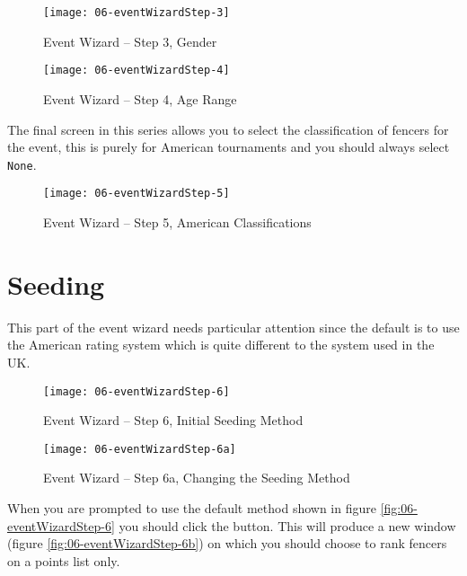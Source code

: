 \documentclass[a4paper,11pt]{memoir}
\begin{document}
\begin{figure}[!ht]
 \centering
 \begin{minipage}{0.4\textwidth}
  \centering
  \texttt{[image: 06-eventWizardStep-3]}
  \caption{Event Wizard -- Step 3, Gender} \label{fig:06-eventWizardStep-3}
\end{minipage}
\hfill
 \begin{minipage}{0.4\textwidth}
  \centering
  \texttt{[image: 06-eventWizardStep-4]}
  \caption{Event Wizard -- Step 4, Age Range} \label{fig:06-eventWizardStep-4}
\end{minipage}
\end{figure}

The final screen in this series allows you to select the classification of fencers for the event, this is purely for American tournaments and you should always select \texttt{None}.

\begin{figure}[!ht]
 \centering
 \texttt{[image: 06-eventWizardStep-5]}
 \caption{Event Wizard -- Step 5, American Classifications} \label{fig:06-eventWizardStep-5}
\end{figure}

\section{Seeding}
This part of the event wizard needs particular attention since the default is to use the American rating system which is quite different to the system used in the UK. 

\begin{figure}[!ht]
 \centering
 \begin{minipage}{0.4\textwidth}
  \centering
  \texttt{[image: 06-eventWizardStep-6]}
  \caption{Event Wizard -- Step 6, Initial Seeding Method} \label{fig:06-eventWizardStep-6}
 \end{minipage}
 \hfill
 \begin{minipage}{0.4\textwidth}
  \centering
  \texttt{[image: 06-eventWizardStep-6a]}
  \caption{Event Wizard -- Step 6a, Changing the Seeding Method} \label{fig:06-eventWizardStep-6a}
 \end{minipage}
\end{figure}

When you are prompted to use the default  method shown in figure \ref{fig:06-eventWizardStep-6} you should click the  button. This will produce a new window (figure \ref{fig:06-eventWizardStep-6b}) on which you should choose to rank fencers on a points list only.
\end{document}
